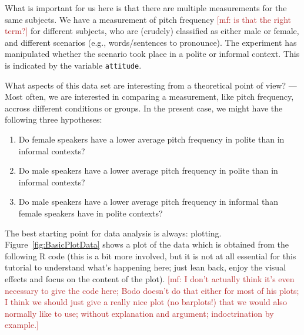 \documentclass[fleqn,reqno,12pt]{article}
\renewcommand{\mf}[1]{\textcolor{firebrick}{[mf: #1]}}
\begin{document}
\medskip

\noindent What is important for us here is that there are multiple measurements for the same subjects. We have a measurement of pitch frequency \mf{is that the right term?} for different subjects, who are (crudely) classified as either male or female, and different scenarios (e.g., words/sentences to pronounce). The experiment has manipulated whether the scenario took place in a polite or informal context. This is indicated by the variable \texttt{attitude}.

What aspects of this data set are interesting from a theoretical point of view? --- Most often, we are interested in comparing a measurement, like pitch frequency, accross different conditions or groups. In the present case, we might have the following three hypotheses:

\begin{enumerate}[{H}1:]
\item Do female speakers have a lower average pitch frequency in polite than in informal contexts?
\item Do male speakers have a lower average pitch frequency in polite than in informal contexts?
\item Do male speakers have a lower average pitch frequency in informal than female speakers have in polite contexts?
\end{enumerate}

\noindent The best starting point for data analysis is always: plotting. Figure~\ref{fig:BasicPlotData} shows a plot of the data which is obtained from the following R code (this is a bit more involved, but it is not at all essential for this tutorial to understand what's happening here; just lean back, enjoy the visual effects and focus on the content of the plot). \mf{I don't actually think it's even necessary to give the code here; Bodo doesn't do that either for most of his plots; I think we should just give a really nice plot (no barplots!) that we would also normally like to use; without explanation and argument; indoctrination by example.}
\end{document}
